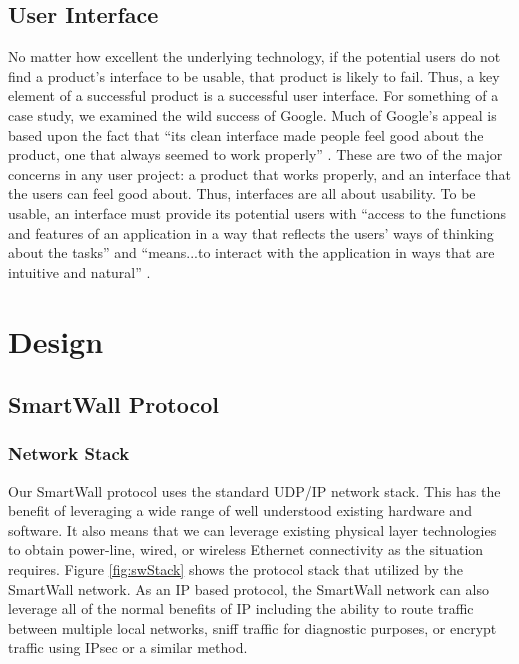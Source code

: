 \documentclass[12pt]{article}
\begin{document}
\subsection{User Interface}
No matter how excellent the underlying technology, if the potential
users do not find a product’s interface to be usable, that product is
likely to fail. Thus, a key element of a successful product is a
successful user interface. For something of a case study, we examined the
wild success of Google. Much of Google's appeal is based upon the fact
that “its clean interface made people feel good about the product,
one that always seemed to work properly” \cite{googleStory}. These are
two of the major concerns in any user project: a product that works
properly, and an
interface that the users can feel good about. Thus, interfaces are
all about usability. To be usable, an interface must provide its
potential users with “access to the functions and features of an
application in a way that reflects the users’ ways of thinking about
the tasks” and “means...to interact with the application in ways that
are intuitive and natural” \cite{UIDesign}.

\section{Design}

\subsection{SmartWall Protocol}
\subsubsection{Network Stack}
\label{sec:Design.SmartWallProtocol.NetworkStack}
Our SmartWall protocol uses the standard UDP/IP network stack.
This has the benefit of
leveraging a wide range of well understood existing hardware and
software. It also means that we can leverage existing physical layer
technologies to obtain power-line, wired, or wireless Ethernet
connectivity as the situation requires. Figure \ref{fig:swStack} shows
the protocol stack that utilized by the SmartWall network. As an IP
based protocol, the SmartWall network can also leverage all of the
normal benefits of IP including the ability to route traffic between
multiple local networks, sniff traffic for diagnostic purposes, or
encrypt traffic using IPsec or a similar method.
\end{document}
